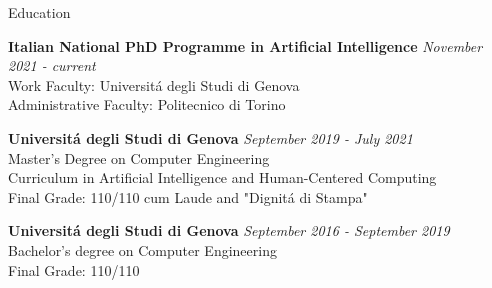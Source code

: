 \documentclass{resume} %
\begin{document}

\begin{rSection}{Education}

{\bf  Italian National PhD Programme in Artificial Intelligence} \hfill {\em November 2021 - \textit{current}} \\ 
Work Faculty: Universit\'a degli Studi di Genova\\
Administrative Faculty: Politecnico di Torino 

{\bf Universit\'a degli Studi di Genova} \hfill {\em September 2019 - July 2021} \\ 
Master's Degree on Computer Engineering \\
Curriculum in Artificial Intelligence and Human-Centered Computing \\
Final Grade: 110/110 cum Laude and "Dignit\'a di Stampa" 

{\bf Universit\'a degli Studi di Genova} \hfill {\em September 2016 - September 2019} \\ 
Bachelor's degree on Computer Engineering \\
Final Grade: 110/110 
\end{rSection}


\end{document}
